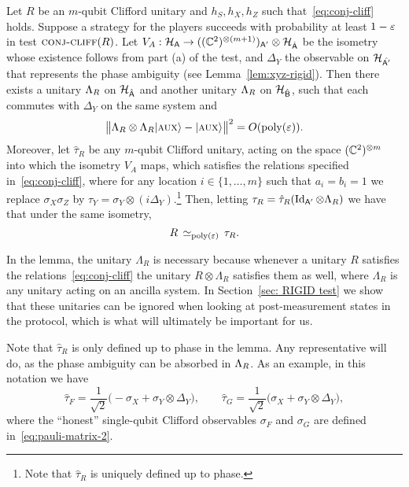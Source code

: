 \begin{lemma}\label{lem:cliff-conj}
Let $R$ be an $m$-qubit Clifford unitary and $h_S,h_X,h_Z$ such that~\eqref{eq:conj-cliff} holds. Suppose a strategy for the players succeeds with probability at least $1-\varepsilon$ in test $\textsc{conj-cliff}(R)$. Let $V_A:\mathcal{H}_{\textsf{A}} \to ((\mathbb{C}^2)^{\otimes (m+1)})_{{\textsf{A}}'}  \otimes {\mathcal{H}}_{\hat{{\textsf{A}}}}$ be the isometry whose existence follows from part (a) of the test, and $\Delta_Y$ the observable on $\mathcal{H}_{\hat{{\textsf{A}}'}}$ that represents the phase ambiguity (see Lemma~\ref{lem:xyz-rigid}). 
Then there exists a unitary $\Lambda_R$ on ${\mathcal{H}}_{\hat{{\textsf{A}}}}$ and another unitary $\Lambda_R$ on ${\mathcal{H}}_{\hat{{\textsf{B}}}}$, such that each commutes with $\Delta_Y$ on the same system and
\begin{equation}\label{eq:r-stab}
 \big\|\Lambda_R \otimes \Lambda_R |\textsc {aux}\rangle - |\textsc {aux}\rangle \big\|^2 = O(\operatorname{poly}(\varepsilon)).
\end{equation}
Moreover, let $\hat{\tau}_R$ be any $m$-qubit Clifford unitary, acting on the space $(\mathbb{C}^2)^{\otimes m}$ into which the isometry $V_A$ maps, which satisfies the relations specified in~\eqref{eq:conj-cliff}, where for any location $i\in\{1,\ldots,m\}$ such that $a_i=b_i=1$ we replace $\sigma_X\sigma_Z$ by $\tau_Y = \sigma_Y \otimes (i\Delta_Y)$.\footnote{Note that $\hat{\tau}_R$ is uniquely defined up to phase.} Then, letting  $ \tau_R = \hat{\tau}_{R}(\mathop{\rm Id}\nolimits_{{\textsf{A}}'} \otimes \Lambda_R)$ we have that  under the same isometry,
$$R \,\simeq_{\operatorname{poly}(\varepsilon)}\, \tau_R.$$
\end{lemma}

In the lemma, the unitary $\Lambda_R$ is necessary because whenever a unitary $R$ satisfies the relations~\eqref{eq:conj-cliff} the unitary $R\otimes \Lambda_R$ satisfies them as well, where $\Lambda_R$ is any unitary acting on an ancilla system. In Section~\ref{sec: RIGID test} we show that these unitaries can be ignored when looking at post-measurement states in the protocol, which is what will ultimately be important for us.  

Note that $\hat{\tau}_R$ is only defined up to phase in the lemma. Any representative will do, as  the phase ambiguity can be absorbed in $\Lambda_R$. As an example, in this notation we have 
\begin{equation}\label{eq:hat-tau-def}
\hat{\tau}_F = \frac{1}{\sqrt{2}}\big(-\sigma_X + \sigma_Y \otimes \Delta_Y\big),\qquad \hat{\tau}_G = \frac{1}{\sqrt{2}}\big(\sigma_X + \sigma_Y \otimes \Delta_Y\big),
\end{equation}
where the ``honest'' single-qubit Clifford observables $\sigma_F$ and $\sigma_G$ are defined in~\eqref{eq:pauli-matrix-2}.

